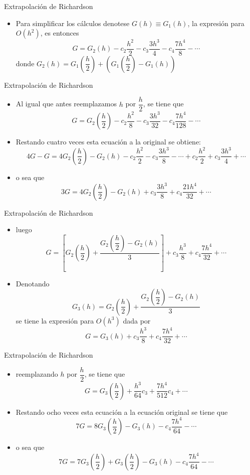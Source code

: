 \documentclass[12pt]{beamer}
\begin{document}
\begin{frame}{Extrapolaci\'on de Richardson}
  \begin{itemize}
    \item Para simplificar los c\'alculos denotese $G(h) \equiv G_1(h)$, la expresi\'on para $O(h^2)$, es entonces
    $$
    G = G_2(h) - c_2 \dfrac{h^2}{2} - c_3\dfrac{3h^3}{4} - c_4\dfrac{7h^4}{8} - \cdots
    $$
    donde $G_2(h) = G_1\left(\dfrac{h}{2}\right)+\left(G_1\left(\dfrac{h}{2}\right)-G_1(h)\right)$
  \end{itemize}  
\end{frame}
\begin{frame}{Extrapolaci\'on de Richardson}
  \begin{itemize}
    \item Al igual que antes reemplazamos  $h$ por $\dfrac{h}{2}$, se tiene que
    $$
     G = G_2\left(\dfrac{h}{2}\right) - c_2 \dfrac{h^2}{8} - c_3\dfrac{3h^3}{32} - c_4\dfrac{7h^4}{128} - \cdots
    $$
    \item<2-> Restando cuatro veces esta ecuaci\'on a la original se obtiene:
    $$
    4G-G = 4G_2\left(\dfrac{h}{2}\right) -G_2(h)- c_2 \dfrac{h^2}{2} - c_3\dfrac{3h^3}{8} - \cdots + 
    c_2 \dfrac{h^2}{2} + c_3\dfrac{3h^3}{4} + \cdots
    $$  
    \item<3-> o sea que
    $$
    3G = 4G_2\left(\dfrac{h}{2}\right) -G_2(h)+ c_3\dfrac{3h^3}{8} + c_4\dfrac{21h^4}{32} + \cdots
    $$
  \end{itemize}
\end{frame}
\begin{frame}{Extrapolaci\'on de Richardson}
  \begin{itemize}
    \item luego
    $$
    G = \left[G_2\left(\dfrac{h}{2}\right)+\dfrac{G_2\left(\dfrac{h}{2}\right)-G_2(h)}{3}\right]+ c_3\dfrac{h^3}{8} + 
    c_4\dfrac{7h^4}{32} + \cdots
    $$
    \item<2-> Denotando
    $$
    G_3(h) = G_2\left(\dfrac{h}{2}\right)+\dfrac{G_2\left(\dfrac{h}{2}\right)-G_2(h)}{3}
    $$
    se tiene la expresi\'on para $O(h^3)$ dada por    
    $$
     G = G_3(h) + c_3\dfrac{h^3}{8} + c_4\dfrac{7h^4}{32} + \cdots
    $$
  \end{itemize}
\end{frame}
\begin{frame}{Extrapolaci\'on de Richardson}
  \begin{itemize}
    \item reemplazando $h$ por $\dfrac{h}{2}$, se tiene que
    $$
      G = G_3\left(\dfrac{h}{2}\right) + \dfrac{h^3}{64}c_3 + \dfrac{7h^4}{512}c_4 + \cdots
    $$
    \item<2-> Restando ocho veces esta ecuaci\'on a la ecuaci\'on original se tiene que 
    $$
    7G = 8G_3\left(\dfrac{h}{2}\right) -G_3(h)- c_4\dfrac{7h^4}{64} - \cdots 
    $$
    \item<3-> o sea que
    $$
    7G = 7G_3\left(\dfrac{h}{2}\right)+G_3\left(\dfrac{h}{2}\right) -G_3(h)- c_4\dfrac{7h^4}{64} - \cdots 
    $$    
  \end{itemize}
\end{frame}
\end{document}
